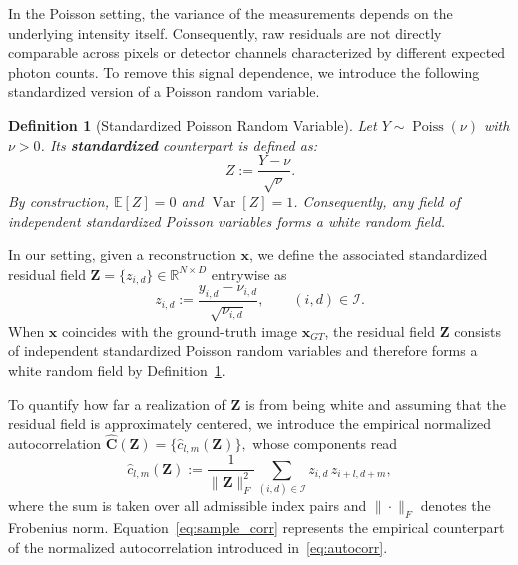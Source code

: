\documentclass[letterpaper]{article}
\newtheorem{definition}{Definition}
\begin{document}
In the Poisson setting, the variance of the measurements depends on the underlying intensity itself. Consequently, raw residuals are not directly comparable across pixels or detector channels characterized by different expected photon counts. To remove this signal dependence, we introduce the following standardized version of a Poisson random variable.


\begin{definition}[Standardized Poisson Random Variable]
\label{def:standardized_poisson}
Let $Y \sim \operatorname{Poiss}(\nu)$ with $\nu > 0$. Its \textbf{standardized} 
counterpart is defined as:
\begin{equation}
    Z := \frac{Y - \nu}{\sqrt{\nu}}.
    \label{eq:standardization}
\end{equation}
By construction, $\mathbb{E}[Z] = 0$ and $\operatorname{Var}[Z] = 1$. Consequently, 
any field of independent standardized Poisson variables forms a white random field.
\end{definition}

In our setting, given a reconstruction $\mathbf{x}$, we define the associated standardized residual field
$
\mathbf Z
=
\{z_{i,d}\}
\in
\mathbb R^{N\times D}
$
entrywise as
\begin{equation}
\label{eq:residual_field}
z_{i,d}
:=
\frac{
y_{i,d}-\nu_{i,d}
}{
\sqrt{\nu_{i,d}}
},
\qquad
(i,d)\in\mathcal I.
\end{equation}
When $\mathbf{x}$ coincides with the ground-truth image $\mathbf{x}_{GT}$, the residual field $\mathbf Z$ consists of independent standardized Poisson random variables and therefore forms a white random field by Definition~\ref{def:standardized_poisson}.


To quantify how far a realization of $\mathbf Z$  is from being white and assuming that the residual field is approximately centered, we introduce the empirical normalized autocorrelation
$
\hat{\mathbf C}(\mathbf Z)
=
\{\hat c_{l,m}(\mathbf Z)\},
$
whose components read
\begin{equation}
\label{eq:sample_corr}
\hat c_{l,m}(\mathbf Z)
:=
\frac{1}{\|\mathbf Z\|_F^2}
\sum_{(i,d)\in\mathcal I}
z_{i,d}\,
z_{i+l,d+m},
\end{equation}
where the sum is taken over all admissible index pairs and $\|\cdot\|_F$ denotes the Frobenius norm. Equation~\eqref{eq:sample_corr} represents the empirical counterpart of the normalized autocorrelation introduced in~\eqref{eq:autocorr}.
\end{document}
